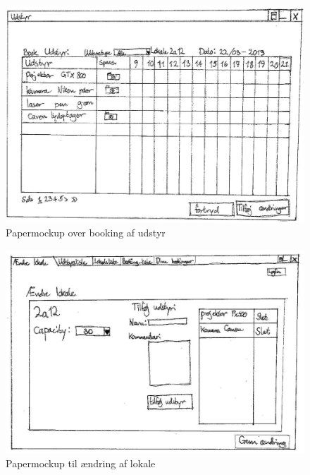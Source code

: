 \begin{figure}[h!]
  \centering
    \includegraphics[angle=90, height=0.9\textheight]{Appendix/GUI-Prototype/PaperMockup/BookUdstyr_001}
  \caption{Papermockup over booking af udstyr}
\label{App_GUI_paper_BookUdstyr}
\end{figure}

\begin{figure}[h!]
  \centering
    \includegraphics[angle=90, height=0.9\textheight]{Appendix/GUI-Prototype/PaperMockup/AendreLokale_001}
  \caption{Papermockup  til ændring af lokale}
\label{App_GUI_paper_AendreLokale}
\end{figure}

